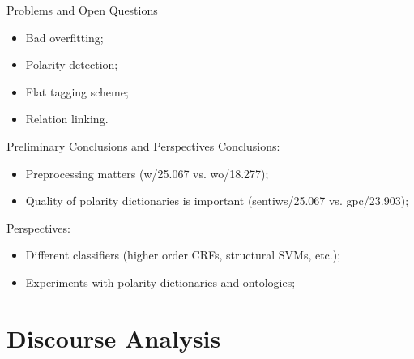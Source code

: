\documentclass{beamer}
\begin{document}
    \begin{frame}{Problems and Open Questions}
      \begin{itemize}
        \item Bad overfitting;
        \item Polarity detection;
        \item Flat tagging scheme;
        \item Relation linking.
      \end{itemize}
    \end{frame}

    \begin{frame}{Preliminary Conclusions and Perspectives}
      Conclusions:
      \begin{itemize}
        \item Preprocessing matters (w/25.067 vs. wo/18.277);
        \item Quality of polarity dictionaries is important (sentiws/25.067 vs. gpc/23.903);
      \end{itemize}

      Perspectives:
      \begin{itemize}
        \item Different classifiers (higher order CRFs, structural SVMs, etc.);
        \item Experiments with polarity dictionaries and ontologies;
      \end{itemize}
    \end{frame}

    \section{Discourse Analysis}
\end{document}
